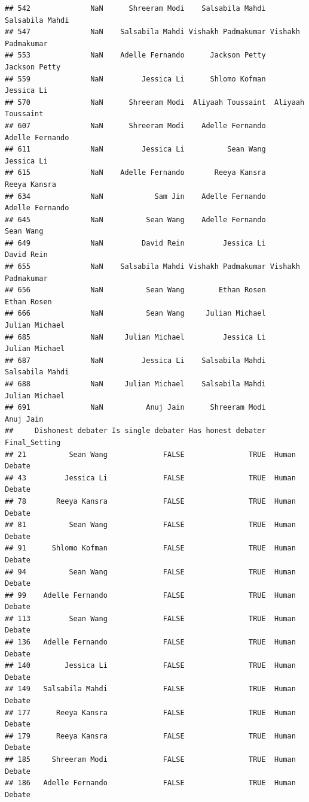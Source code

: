 \documentclass[
]{article}
\begin{document}
\begin{verbatim}
## 542              NaN      Shreeram Modi    Salsabila Mahdi    Salsabila Mahdi
## 547              NaN    Salsabila Mahdi Vishakh Padmakumar Vishakh Padmakumar
## 553              NaN    Adelle Fernando      Jackson Petty      Jackson Petty
## 559              NaN         Jessica Li      Shlomo Kofman         Jessica Li
## 570              NaN      Shreeram Modi  Aliyaah Toussaint  Aliyaah Toussaint
## 607              NaN      Shreeram Modi    Adelle Fernando    Adelle Fernando
## 611              NaN         Jessica Li          Sean Wang         Jessica Li
## 615              NaN    Adelle Fernando       Reeya Kansra       Reeya Kansra
## 634              NaN            Sam Jin    Adelle Fernando    Adelle Fernando
## 645              NaN          Sean Wang    Adelle Fernando          Sean Wang
## 649              NaN         David Rein         Jessica Li         David Rein
## 655              NaN    Salsabila Mahdi Vishakh Padmakumar Vishakh Padmakumar
## 656              NaN          Sean Wang        Ethan Rosen        Ethan Rosen
## 666              NaN          Sean Wang     Julian Michael     Julian Michael
## 685              NaN     Julian Michael         Jessica Li     Julian Michael
## 687              NaN         Jessica Li    Salsabila Mahdi    Salsabila Mahdi
## 688              NaN     Julian Michael    Salsabila Mahdi     Julian Michael
## 691              NaN          Anuj Jain      Shreeram Modi          Anuj Jain
##     Dishonest debater Is single debater Has honest debater Final_Setting
## 21          Sean Wang             FALSE               TRUE  Human Debate
## 43         Jessica Li             FALSE               TRUE  Human Debate
## 78       Reeya Kansra             FALSE               TRUE  Human Debate
## 81          Sean Wang             FALSE               TRUE  Human Debate
## 91      Shlomo Kofman             FALSE               TRUE  Human Debate
## 94          Sean Wang             FALSE               TRUE  Human Debate
## 99    Adelle Fernando             FALSE               TRUE  Human Debate
## 113         Sean Wang             FALSE               TRUE  Human Debate
## 136   Adelle Fernando             FALSE               TRUE  Human Debate
## 140        Jessica Li             FALSE               TRUE  Human Debate
## 149   Salsabila Mahdi             FALSE               TRUE  Human Debate
## 177      Reeya Kansra             FALSE               TRUE  Human Debate
## 179      Reeya Kansra             FALSE               TRUE  Human Debate
## 185     Shreeram Modi             FALSE               TRUE  Human Debate
## 186   Adelle Fernando             FALSE               TRUE  Human Debate

\end{verbatim}
\end{document}
